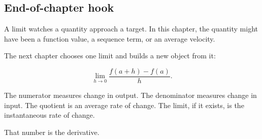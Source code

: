 \subsection{End-of-chapter hook}
\label{subsec:chapter3-hook-to-derivative}

A limit watches a quantity approach a target.  In this chapter, the quantity might have been a function value, a sequence term, or an average velocity.

The next chapter chooses one limit and builds a new object from it:

\[
\lim_{h\to0}\frac{f(a+h)-f(a)}{h}.
\]

The numerator measures change in output.  The denominator measures change in input.  The quotient is an average rate of change.  The limit, if it exists, is the instantaneous rate of change.

That number is the derivative.
